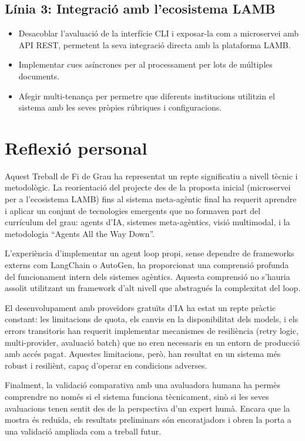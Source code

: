 \documentclass[12pt,a4paper,twoside]{report}
\begin{document}
\subsection{L\'inia 3: Integraci\'o amb l'ecosistema LAMB}

\begin{itemize}
    \item Desacoblar l'avaluaci\'o de la interf\'icie CLI i exposar-la com a microservei amb API REST, permetent la seva integraci\'o directa amb la plataforma LAMB.
    \item Implementar cues as\'incrones per al processament per lots de m\'ultiples documents.
    \item Afegir multi-tenan\c{c}a per permetre que diferents institucions utilitzin el sistema amb les seves pr\`opies r\'ubriques i configuracions.
\end{itemize}


\section{Reflexi\'o personal}
\label{sec:reflexio}

Aquest Treball de Fi de Grau ha representat un repte significatiu a nivell t\`ecnic i metodol\`ogic. La reorientaci\'o del projecte des de la proposta inicial (microservei per a l'ecosistema LAMB) fins al sistema meta-ag\`entic final ha requerit aprendre i aplicar un conjunt de tecnologies emergents que no formaven part del curr\'iculum del grau: agents d'IA, sistemes meta-ag\`entics, visi\'o multimodal, i la metodologia ``Agents All the Way Down''.

L'experi\`encia d'implementar un agent loop propi, sense dependre de frameworks externs com LangChain o AutoGen, ha proporcionat una comprensi\'o profunda del funcionament intern dels sistemes ag\`entics. Aquesta comprensi\'o no s'hauria assolit utilitzant un framework d'alt nivell que abstragu\'es la complexitat del loop.

El desenvolupament amb prove\"idors gratu\"its d'IA ha estat un repte pr\`actic constant: les limitacions de quota, els canvis en la disponibilitat dels models, i els errors transitoris han requerit implementar mecanismes de resili\`encia (retry logic, multi-provider, avaluaci\'o batch) que no eren necessaris en un entorn de producci\'o amb acc\'es pagat. Aquestes limitacions, per\`o, han resultat en un sistema m\'es robust i resili\`ent, capa\c{c} d'operar en condicions adverses.

Finalment, la validaci\'o comparativa amb una avaluadora humana ha perm\`es comprendre no nom\'es si el sistema funciona t\`ecnicament, sin\`o si les seves avaluacions tenen sentit des de la perspectiva d'un expert hum\`a. Encara que la mostra \'es redu\"ida, els resultats preliminars s\'on encoratjadors i obren la porta a una validaci\'o ampliada com a treball futur.
\end{document}

